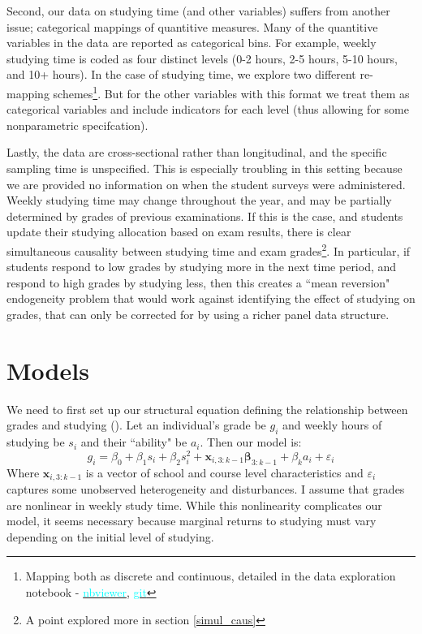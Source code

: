 \documentclass[12pt]{article}
\begin{document}
Second, our data on studying time (and other variables) suffers from another issue; categorical mappings of quantitive measures. Many of the quantitive variables in the data are reported as categorical bins. For example, weekly studying time is coded as four distinct levels (0-2 hours, 2-5 hours, 5-10 hours, and 10+ hours). In the case of studying time, we explore two different re-mapping schemes\footnote{Mapping both as discrete and continuous, detailed in the data exploration notebook - \href{https://nbviewer.jupyter.org/github/nadavtadelis/Reproducible_Metrics/blob/master/data_exploration.ipynb}{\textcolor{cyan}{nbviewer}}, \href{https://github.com/nadavtadelis/Reproducible_Metrics/blob/master/data_exploration.ipynb}{\textcolor{cyan}{git}}}. But for the other variables with this format we treat them as categorical variables and include indicators for each level (thus allowing for some nonparametric specifcation).

Lastly, the data are cross-sectional rather than longitudinal, and the specific sampling time is unspecified. This is especially troubling in this setting because we are provided no information on when the student surveys were administered. Weekly studying time may change throughout the year, and may be partially determined by grades of previous examinations. If this is the case, and students update their studying allocation based on exam results, there is clear simultaneous causality between studying time and exam grades\footnote{A point explored more in section \ref{simul_caus}}. In particular, if students respond to low grades by studying more in the next time period, and respond to high grades by studying less, then this creates a ``mean reversion" endogeneity problem that would work against identifying the effect of studying on grades, that can only be corrected for by using a richer panel data structure.


\newpage
\section{Models} \label{models}
We need to first set up our structural equation defining the relationship between grades and studying (\cite{CardKrueger}). Let an individual's grade be $g_i$ and weekly hours of studying be $s_i$ and their ``ability" be $a_i$. Then our model is:
$$
g_i = \beta_0 + \beta_1 s_i + \beta_2 s_i^2  + \bm{x}_{i,3:k-1}\bm{\beta}_{3:k-1} + \beta_k a_i + \varepsilon_i
$$
Where $\bm{x}_{i,3:k-1}$ is a vector of school and course level characteristics and $\varepsilon_i$ captures some unobserved heterogeneity and disturbances. I assume that grades are nonlinear in weekly study time. While this nonlinearity complicates our model, it seems necessary because marginal returns to studying must vary depending on the initial level of studying.
\end{document}
